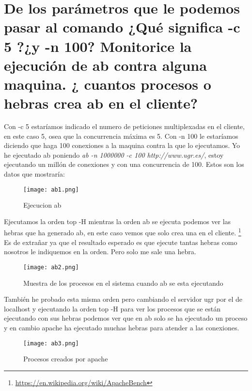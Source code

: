 \section{De los parámetros que le podemos pasar al comando ¿Qué significa -c 5 ?¿y -n 100? Monitorice la ejecución de ab contra alguna maquina. ¿ cuantos procesos o hebras crea ab en el cliente?}
Con -c 5 estaríamos indicado el numero de peticiones multiplexadas en el cliente, en este caso 5, osea que la concurrencia máxima es 5.
Con -n 100 le estaríamos diciendo que haga 100 conexiones a la maquina contra la que lo ejecutamos.
Yo he ejecutado ab poniendo \textit{ab -n 1000000 -c 100 http://www.ugr.es/}, estoy ejecutando un millón de conexiones y con una concurrencia de 100. Estos son los datos que mostraría:
\begin{figure}[H] 
\centering
\texttt{[image: ab1.png]}  
\label{figura9:}
\caption{Ejecucion ab}
\end{figure}
Ejecutamos la orden top -H mientras la orden ab se ejecuta podemos ver las hebras que ha generado ab, en este caso vemos que solo crea una en el cliente. \footnote{\url{https://en.wikipedia.org/wiki/ApacheBench}} Es de extrañar ya que el resultado esperado es que ejecute tantas hebras como nosotros le indiquemos en la orden. Pero solo me sale una hebra.
\begin{figure}[H] 
\centering
\texttt{[image: ab2.png]}  
\label{figura10:}
\caption{Muestra de los procesos en el sistema cuando ab se esta ejecutando}
\end{figure}
También he probado esta misma orden pero cambiando el servidor ugr por el de localhost y ejecutando la orden top -H para ver los procesos que se están ejecutando con sus hebras podemos ver que en ab solo se ha ejecutado un proceso y en cambio apache ha ejecutado muchas hebras para atender a las conexiones.
\begin{figure}[H] 
\centering
\texttt{[image: ab3.png]}  
\label{figura11:}
\caption{Procesos creados por apache}
\end{figure}
